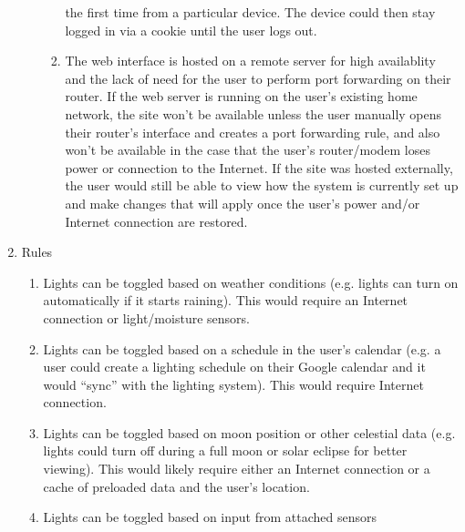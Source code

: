 \documentclass[12pt]{article}
\begin{document}
\begin{enumerate}[resume]
\begin{enumerate}
\begin{enumerate}
                        the first time from a particular device.  The device
                        could then stay logged in via a cookie until the user
                        logs out.
                    \item The web interface is hosted on a remote server for
                        high availablity and the lack of need for the user to
                        perform port forwarding on their router.  If the web
                        server is running on the user's existing home network,
                        the site won't be available unless the user manually
                        opens their router's interface and creates a port
                        forwarding rule, and also won't be available in the
                        case that the user's router/modem loses power or
                        connection to the Internet.  If the site was hosted
                        externally, the user would still be able to view how
                        the system is currently set up and make changes that
                        will apply once the user's power and/or Internet
                        connection are restored.
                \end{enumerate}
        \end{enumerate}
    \item Rules
        \begin{enumerate}
            \item Lights can be toggled based on weather conditions (e.g.
                lights can turn on automatically if it starts raining).  This
                would require an Internet connection or light/moisture sensors.
            \item Lights can be toggled based on a schedule in the user's
                calendar (e.g. a user could create a lighting schedule on their
                Google calendar and it would ``sync'' with the lighting
                system).  This would require Internet connection.
            \item Lights can be toggled based on moon position or other
                celestial data (e.g. lights could turn off during a full moon
                or solar eclipse for better viewing).  This would likely
                require either an Internet connection or a cache of preloaded
                data and the user's location.
            \item Lights can be toggled based on input from attached sensors
                \begin{enumerate}

\end{enumerate}
\end{enumerate}
\end{enumerate}
\end{document}
